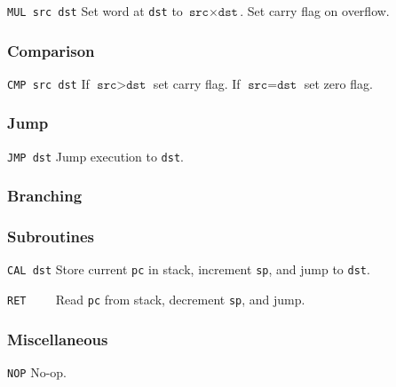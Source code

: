 \documentclass[a5paper,onecolumn,final,10pt]{memoir}
\begin{document}
\noindent\texttt{MUL src dst} \quad Set word at \texttt{dst} to $\texttt{src}×\texttt{dst}$. Set carry flag on overflow. 

\subsubsection*{Comparison}

\noindent\texttt{CMP src dst} \quad If $\texttt{src}>\texttt{dst}$ set carry flag. If $\texttt{src}=\texttt{dst}$ set zero flag. 

\subsubsection*{Jump}

\noindent\texttt{JMP dst} \quad Jump execution to \texttt{dst}. 

\subsubsection*{Branching}

\subsubsection*{Subroutines}

\noindent\texttt{CAL dst} \quad Store current \texttt{pc} in stack, increment \texttt{sp}, and jump to \texttt{dst}. 

\noindent\texttt{RET~~~~} \quad Read \texttt{pc} from stack, decrement \texttt{sp}, and jump. 

\subsubsection*{Miscellaneous}

\noindent\texttt{NOP} \quad No-op. 
\end{document}
